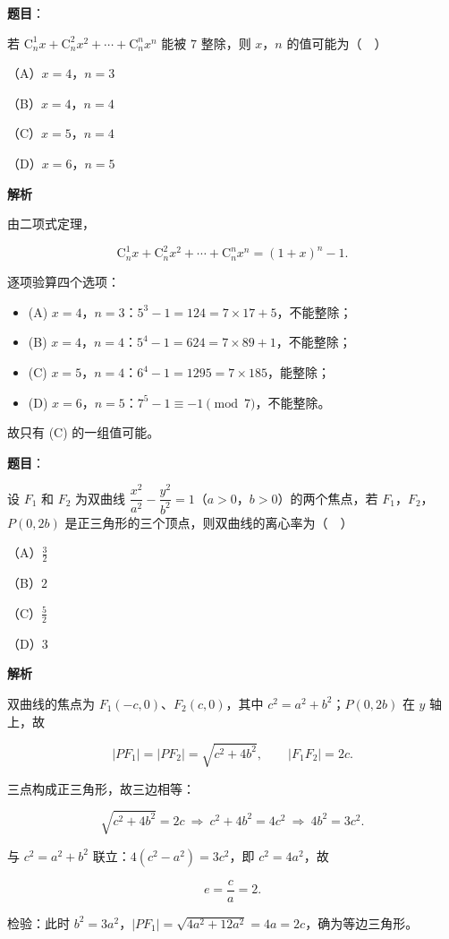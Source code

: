 \begin{answer}

\textbf{题目}：

若 $\mathrm C_n^1x+\mathrm C_n^2x^2+\cdots+\mathrm C_n^nx^n$ 能被 $7$ 整除，则 $x$，$n$ 的值可能为（　）

（A）$x=4$，$n=3$

（B）$x=4$，$n=4$

（C）$x=5$，$n=4$

（D）$x=6$，$n=5$

\textbf{解析}

由二项式定理，

\nopagebreak[4]
\[\mathrm C_n^1x+\mathrm C_n^2x^2+\cdots+\mathrm C_n^nx^n=(1+x)^n-1.\]

逐项验算四个选项：

\begin{itemize}
\item (A) $x=4$，$n=3$：$5^3-1=124=7\times17+5$，不能整除；
\item (B) $x=4$，$n=4$：$5^4-1=624=7\times89+1$，不能整除；
\item (C) $x=5$，$n=4$：$6^4-1=1295=7\times185$，能整除；
\item (D) $x=6$，$n=5$：$7^5-1\equiv-1\pmod 7$，不能整除。
\end{itemize}

故只有 (C) 的一组值可能。


\end{answer}
\begin{answer}

\textbf{题目}：

设 $F_1$ 和 $F_2$ 为双曲线 $\dfrac{x^2}{a^2}-\dfrac{y^2}{b^2}=1$（$a>0$，$b>0$）的两个焦点，若 $F_1$，$F_2$，$P(0,2b)$ 是正三角形的三个顶点，则双曲线的离心率为（　）

（A）$\frac32$

（B）$2$

（C）$\frac52$

（D）$3$

\textbf{解析}

双曲线的焦点为 $F_1(-c,0)$、$F_2(c,0)$，其中 $c^2=a^2+b^2$；$P(0,2b)$ 在 $y$ 轴上，故

\nopagebreak[4]
\[|PF_1|=|PF_2|=\sqrt{c^2+4b^2},\qquad |F_1F_2|=2c.\]

三点构成正三角形，故三边相等：

\nopagebreak[4]
\[\sqrt{c^2+4b^2}=2c\ \Longrightarrow\ c^2+4b^2=4c^2\ \Longrightarrow\ 4b^2=3c^2.\]

与 $c^2=a^2+b^2$ 联立：$4(c^2-a^2)=3c^2$，即 $c^2=4a^2$，故

\nopagebreak[4]
\[e=\frac ca=2.\]

检验：此时 $b^2=3a^2$，$|PF_1|=\sqrt{4a^2+12a^2}=4a=2c$，确为等边三角形。


\end{answer}
